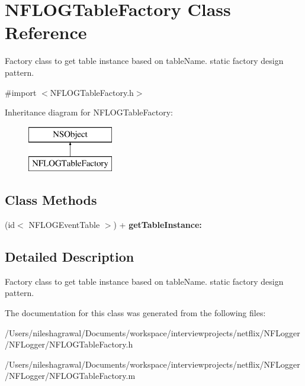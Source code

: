 \hypertarget{interface_n_f_l_o_g_table_factory}{}\section{N\+F\+L\+O\+G\+Table\+Factory Class Reference}
\label{interface_n_f_l_o_g_table_factory}


Factory class to get table instance based on table\+Name. static factory design pattern.  




{\ttfamily \#import $<$N\+F\+L\+O\+G\+Table\+Factory.\+h$>$}

Inheritance diagram for N\+F\+L\+O\+G\+Table\+Factory\+:\begin{figure}[H]
\begin{center}
\leavevmode
\includegraphics[height=2.000000cm]{interface_n_f_l_o_g_table_factory}
\end{center}
\end{figure}
\subsection*{Class Methods}
\begin{DoxyCompactItemize}
\item 
\mbox{\label{interface_n_f_l_o_g_table_factory_a737a8c34cf9f404c726b341e260dc8b5}} 
(id$<$ N\+F\+L\+O\+G\+Event\+Table $>$) + {\bfseries get\+Table\+Instance\+:}
\end{DoxyCompactItemize}


\subsection{Detailed Description}
Factory class to get table instance based on table\+Name. static factory design pattern. 

The documentation for this class was generated from the following files\+:\begin{DoxyCompactItemize}
\item 
/\+Users/nileshagrawal/\+Documents/workspace/interviewprojects/netflix/\+N\+F\+Logger/\+N\+F\+Logger/N\+F\+L\+O\+G\+Table\+Factory.\+h\item 
/\+Users/nileshagrawal/\+Documents/workspace/interviewprojects/netflix/\+N\+F\+Logger/\+N\+F\+Logger/N\+F\+L\+O\+G\+Table\+Factory.\+m\end{DoxyCompactItemize}
